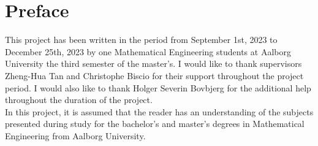 \chapter*{Preface}
This project has been written in the period from September 1st, 2023 to December 25th, 2023 by one Mathematical Engineering students at Aalborg University the third semester of the master's. I would like to thank supervisors Zheng-Hua Tan and Christophe Biscio for their support throughout the project period. I would also like to thank Holger Severin Bovbjerg for the additional help throughout the duration of the project.
\\
In this project, it is assumed that the reader has an understanding of the subjects presented during study for the bachelor's and master's degrees in Mathematical Engineering from Aalborg University.\\ \\
